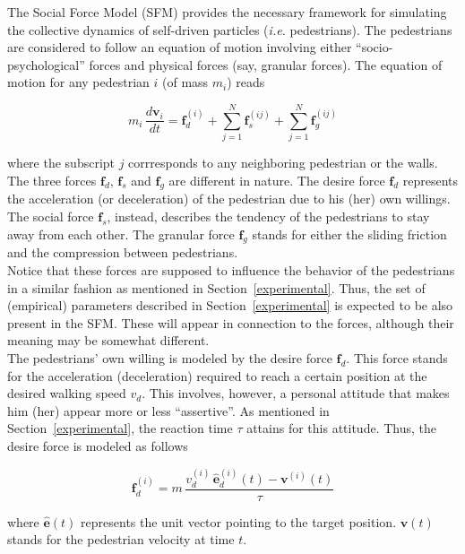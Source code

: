 \documentclass[preprint,12pt]{elsarticle}
\begin{document}
The Social Force Model (SFM) provides the necessary framework for simulating 
the collective dynamics of self-driven particles (\textit{i.e.} pedestrians). 
The pedestrians are considered to follow an equation of motion involving 
either ``socio-psychological'' forces and physical forces (say, granular 
forces). The equation of motion for any pedestrian $i$ (of mass $m_i$) reads

\begin{equation}
 m_i\,\displaystyle\frac{d\mathbf{v}_i}{dt}=\mathbf{f}_d^{(i)}+
 \displaystyle\sum_{j=1}^N\mathbf{f}_s^{(ij)}+
 \displaystyle\sum_{j=1}^N\mathbf{f}_g^{(ij)}\label{eqn_motion}
\end{equation}

\noindent where the subscript $j$ corrresponds to any neighboring pedestrian or 
the walls. The three forces $\mathbf{f}_d$, $\mathbf{f}_s$ and $\mathbf{f}_g$ 
are different in nature. The desire force $\mathbf{f}_d$ represents the 
acceleration (or deceleration) of the pedestrian due to his (her) own willings. 
The social force $\mathbf{f}_s$, instead, describes the tendency of the 
pedestrians to stay away from each other. The granular force $\mathbf{f}_g$ 
stands for either the sliding friction and the compression between 
pedestrians. \\

Notice that these forces are supposed to influence the behavior of the 
pedestrians in a similar fashion as mentioned in Section~\ref{experimental}. 
Thus, the set of (empirical) parameters described in Section~\ref{experimental} 
is expected to be also present in the SFM. These will appear in connection to 
the forces, although their meaning may be somewhat different. \\   

The pedestrians' own willing is modeled by the desire force $\mathbf{f}_d$. 
This force stands for the acceleration (deceleration) required to reach a 
certain position at the desired walking speed $v_d$. This involves, however, a 
personal attitude that makes him (her) appear more or less ``assertive''. As 
mentioned in Section~\ref{experimental}, the reaction time $\tau$  attains for 
this attitude. Thus, the desire force is modeled as follows

\begin{equation}
\mathbf{f}_d^{(i)}=m\,\displaystyle\frac{v_d^{(i)}\,
\hat{\mathbf{e}}_d^{(i)}(t)-
 \mathbf{v}^{(i)}(t)}{\tau}
\end{equation}


\noindent where $\hat{\mathbf{e}}(t)$ represents the unit vector pointing to 
the target position. $\mathbf{v}(t)$ stands for the pedestrian velocity at time 
$t$. \\
\end{document}
